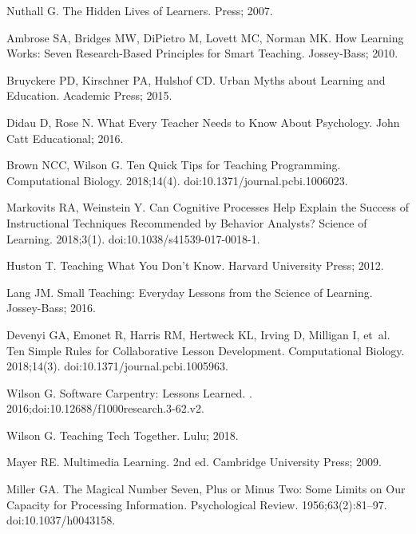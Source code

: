 \documentclass[10pt,letterpaper]{article}
\begin{document}
\begin{thebibliography}{10}

Nuthall G.
\newblock The Hidden Lives of Learners.
 Press; 2007.

Ambrose SA, Bridges MW, DiPietro M, Lovett MC, Norman MK.
\newblock How Learning Works: Seven Research-Based Principles for Smart
  Teaching.
\newblock Jossey-Bass; 2010.

Bruyckere PD, Kirschner PA, Hulshof CD.
\newblock Urban Myths about Learning and Education.
\newblock Academic Press; 2015.

Didau D, Rose N.
\newblock What Every Teacher Needs to Know About Psychology.
\newblock John Catt Educational; 2016.

Brown NCC, Wilson G.
\newblock Ten Quick Tips for Teaching Programming.
 Computational Biology. 2018;14(4).
\newblock doi:{10.1371/journal.pcbi.1006023}.

Markovits RA, Weinstein Y.
\newblock Can Cognitive Processes Help Explain the Success of Instructional
  Techniques Recommended by Behavior Analysts?
 Science of Learning. 2018;3(1).
\newblock doi:{10.1038/s41539-017-0018-1}.

Huston T.
\newblock Teaching What You Don't Know.
\newblock Harvard University Press; 2012.

Lang JM.
\newblock Small Teaching: Everyday Lessons from the Science of Learning.
\newblock Jossey-Bass; 2016.

Devenyi GA, Emonet R, Harris RM, Hertweck KL, Irving D, Milligan I, et~al.
\newblock Ten Simple Rules for Collaborative Lesson Development.
 Computational Biology. 2018;14(3).
\newblock doi:{10.1371/journal.pcbi.1005963}.

Wilson G.
\newblock Software Carpentry: Lessons Learned.
. 2016;doi:{10.12688/f1000research.3-62.v2}.

Wilson G.
\newblock Teaching Tech Together.
\newblock Lulu; 2018.

Mayer RE.
\newblock Multimedia Learning.
\newblock 2nd ed. Cambridge University Press; 2009.

Miller GA.
\newblock The Magical Number Seven, Plus or Minus Two: Some Limits on Our
  Capacity for Processing Information.
\newblock Psychological Review. 1956;63(2):81--97.
\newblock doi:{10.1037/h0043158}.


\end{thebibliography}
\end{document}
